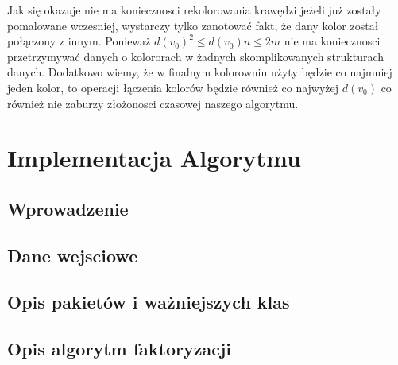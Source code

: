\documentclass[12pt,a4paper,titlepage]{article}
\begin{document}
Jak się okazuje nie ma koniecznosci rekolorowania krawędzi jeżeli już zostały pomalowane wczesniej, wystarczy tylko zanotować fakt, że dany kolor został połączony z innym. Ponieważ $d(v_0)^2  \leqslant d(v_0)n \leqslant 2m $ nie ma koniecznosci przetrzymywać danych o kolororach w żadnych skomplikowanych strukturach danych. Dodatkowo wiemy, że w finalnym kolorowniu użyty będzie co najmniej jeden kolor, to operacji łączenia kolorów będzie również co najwyżej $d(v_0)$ co również nie zaburzy złożonosci czasowej naszego algorytmu.

















\section{Implementacja Algorytmu}
\subsection{Wprowadzenie}
\subsection{Dane wejsciowe}
\subsection{Opis pakietów i ważniejszych klas}
\subsection{Opis algorytm faktoryzacji}
\end{document}
